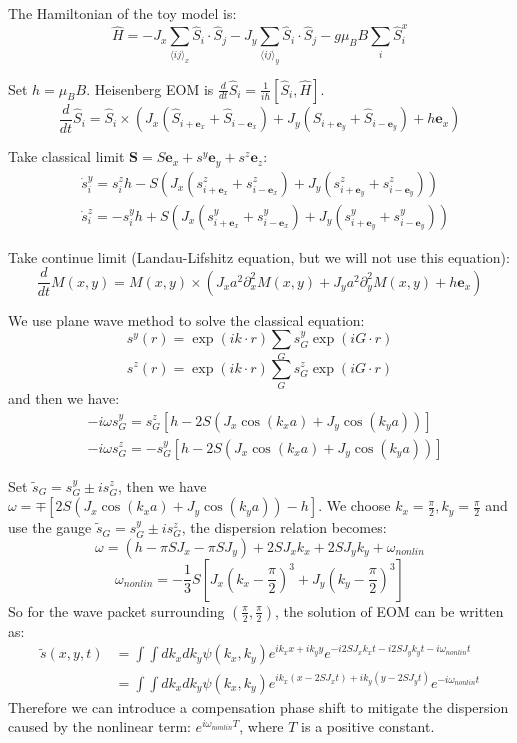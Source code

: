 \documentclass{article}
\begin{document}
The Hamiltonian of the toy model is:
\begin{equation}
    \hat{H}=-J_x\sum_{\langle ij \rangle_x}\hat{S}_i \cdot \hat{S}_j-J_y\sum_{\langle ij \rangle_y}\hat{S}_i \cdot \hat{S}_j - g\mu_BB\sum_{i}\hat{S}_i^x
\end{equation}
\par
Set $h=\mu_BB$. Heisenberg EOM is $\frac{d}{dt}\hat{S}_i=\frac{1}{i\hbar}[\hat{S}_i, \hat{H}]$.
\begin{equation}
    \frac{d}{dt}\hat{S}_i=\hat{S}_i\times\left(J_x(\hat{S}_{i+\mathbf{e}_x}+\hat{S}_{i-\mathbf{e}_x})+J_y(\hat{S}_{i+\mathbf{e}_y}+\hat{S}_{i-\mathbf{e}_y})+h\mathbf{e}_x\right)
\end{equation}
\par
Take classical limit $\mathbf{S}=S\mathbf{e}_x+s^y\mathbf{e}_y+s^z\mathbf{e}_z$:
\begin{align}
    &\dot{s}_i^y=s_i^zh-S(J_x(s^z_{i+\mathbf{e}_x}+s^z_{i-\mathbf{e}_x})+J_y(s^z_{i+\mathbf{e}_y}+s^z_{i-\mathbf{e}_y}))\\
    &\dot{s}_i^z=-s_i^yh+S(J_x(s^y_{i+\mathbf{e}_x}+s^y_{i-\mathbf{e}_x})+J_y(s^y_{i+\mathbf{e}_y}+s^y_{i-\mathbf{e}_y}))
\end{align}
\par
Take continue limit (Landau-Lifshitz equation, but we will not use this equation):
\begin{equation}
    \frac{d}{dt}M(x,y)=M(x,y)\times\left(J_xa^2\partial^2_xM(x,y)+J_ya^2\partial^2_yM(x,y)+h\mathbf{e}_x\right)
\end{equation}
\par
We use plane wave method to solve the classical equation:
$$s^y(r)=\exp(ik\cdot r)\sum_Gs^y_G\exp(iG\cdot r)$$
$$s^z(r)=\exp(ik\cdot r)\sum_Gs^z_G\exp(iG\cdot r)$$
and then we have:
\begin{align}
    &-i\omega s_G^y=s_G^z[h-2S(J_x\cos(k_xa)+J_y\cos(k_ya))]\\
    &-i\omega s_G^z=-s_G^y[h-2S(J_x\cos(k_xa)+J_y\cos(k_ya))]
\end{align}
\par
Set $\tilde{s}_G=s_G^y \pm is_G^z$, then we have $\omega=\mp [2S(J_x\cos(k_xa)+J_y\cos(k_ya))-h]$. We choose $k_x=\frac{\pi}{2},k_y=\frac{\pi}{2}$ and use the gauge $\tilde{s}_G=s_G^y \pm is_G^z$, the dispersion relation becomes:
\begin{equation}
    \omega = \left(h-\pi SJ_x-\pi SJ_y\right)+2SJ_xk_x+2SJ_yk_y+\omega_{nonlin}
\end{equation}
\begin{equation}
    \omega_{nonlin}=-\frac{1}{3}S[J_x(k_x-\frac{\pi}{2})^3+J_y(k_y-\frac{\pi}{2})^3]
\end{equation}
So for the wave packet surrounding $(\frac{\pi}{2},\frac{\pi}{2})$, the solution of EOM can be written as:
\begin{align*}
    \tilde{s}(x,y,t)&=\int\int dk_xdk_y\psi(k_x,k_y)e^{ik_xx+ik_yy}e^{-i2SJ_xk_xt-i2SJ_yk_yt-i\omega_{nonlin}t}\\
    &=\int\int dk_xdk_y\psi(k_x,k_y)e^{ik_x(x-2SJ_xt)+ik_y(y-2SJ_yt)}e^{-i\omega_{nonlin}t}
\end{align*} 
Therefore we can introduce a compensation phase shift to mitigate the dispersion caused by the nonlinear term: $e^{i\omega_{nonlin}T}$, where $T$ is a positive constant.
\end{document}
